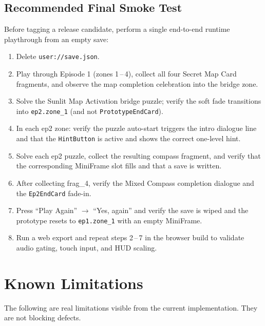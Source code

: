 \documentclass[12pt, a4paper]{article}
\begin{document}
\subsection{Recommended Final Smoke Test}

Before tagging a release candidate, perform a single end-to-end runtime
playthrough from an empty save:

\begin{enumerate}[nosep]
  \item Delete \texttt{user://save.json}.
  \item Play through Episode 1 (zones 1\,--\,4), collect all four Secret Map
        Card fragments, and observe the map completion celebration into the
        bridge zone.
  \item Solve the Sunlit Map Activation bridge puzzle; verify the soft fade
        transitions into \texttt{ep2.zone\_1} (and not \texttt{PrototypeEndCard}).
  \item In each ep2 zone: verify the puzzle auto-start triggers the intro
        dialogue line and that the \texttt{HintButton} is active and shows
        the correct one-level hint.
  \item Solve each ep2 puzzle, collect the resulting compass fragment, and
        verify that the corresponding MiniFrame slot fills and that a save
        is written.
  \item After collecting frag\_4, verify the Mixed Compass completion
        dialogue and the \texttt{Ep2EndCard} fade-in.
  \item Press ``Play Again'' $\to$ ``Yes, again'' and verify the save is
        wiped and the prototype resets to \texttt{ep1.zone\_1} with an empty
        MiniFrame.
  \item Run a web export and repeat steps 2\,--\,7 in the browser build to
        validate audio gating, touch input, and HUD scaling.
\end{enumerate}

\section{Known Limitations}

The following are real limitations visible from the current implementation.
They are not blocking defects.
\end{document}
